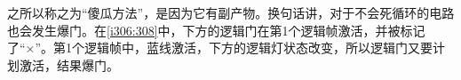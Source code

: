 \begin{figure}
\begin{center}
\qquad
{}
\qquad
{}
\qquad
{}
\end{center}
\caption{}\label{i302:305}
\end{figure}

之所以称之为“傻瓜方法”，是因为它有副产物。换句话讲，对于不会死循环的电路也会发生爆门。在\autoref{i306:308}中，下方的逻辑门在第1个逻辑帧激活，并被标记了“×”。第1个逻辑帧中，蓝线激活，下方的逻辑灯状态改变，所以逻辑门又要计划激活，结果爆门。

